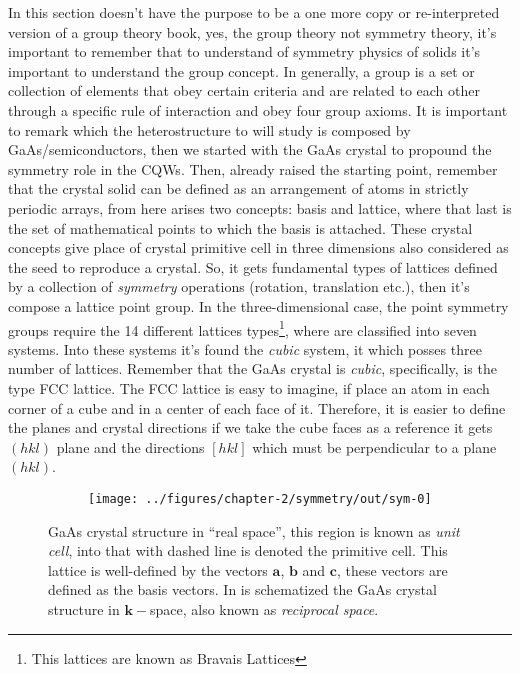 In this section doesn't have the purpose to be a one more copy or re-interpreted version of a group theory book, yes,  the group theory not symmetry theory, it's important to remember that to understand of symmetry physics of solids it's important to understand the group concept. 
In generally, a group is a set or collection of elements that obey certain criteria and are related to each other through a specific rule of interaction and obey four group axioms\cite{powell2010symmetry,cornwell1997group,muller2013symmetry}. 
It is important to remark which the heterostructure to will study is composed by GaAs/\algaas semiconductors, then  we started with the GaAs crystal to propound the symmetry role in the  CQWs.  Then, already raised the starting point,  remember that the crystal solid  can be defined as an  arrangement of atoms in strictly periodic arrays\cite{kittel2018kittel,solyom2007fundamentals}, from here arises two concepts: basis and lattice, where that last is the set of mathematical points to which the basis is attached\cite{kittel2018kittel}. These crystal concepts give place of crystal primitive cell in three dimensions also considered as the seed to reproduce a crystal. So, it gets  fundamental types of lattices defined  by a collection of \emph{symmetry} operations (rotation, translation etc.), then it's compose a lattice point group. In the three-dimensional case, the point symmetry groups require the 14 different lattices types\footnote{This lattices are known as Bravais Lattices}, where are classified into seven systems. Into these systems it's found the \emph{cubic} system, it which posses three number of lattices. Remember that the GaAs crystal is \emph{cubic},  specifically, is the type FCC lattice.  The FCC lattice is easy to imagine, if place an atom in each corner of  a cube and in a center of each face of it. Therefore, it is easier  to define  the planes and crystal directions if we take the cube faces as a reference it gets $(hkl)$ plane and the directions $\left[hkl\right]$ which must be perpendicular to a plane $(hkl)$\cite{kittel2018kittel}. 
\begin{figure}[h!]
	\centering
	\begin{subfigure}{\textwidth}
		\texttt{[image: ../figures/chapter-2/symmetry/out/sym-0]}
		\label{subfig:subsubsection-2.1-crystal-rspace-a)}
		\label{subfig:subsubsection-2.1-crystal-kspace-b)}
	\end{subfigure}
	\caption{ GaAs crystal structure in ``real space'',  this region is known as \emph{unit cell}, into that with dashed line is denoted the primitive cell. This lattice is well-defined by the vectors $\mathbf{a}$, $\mathbf{b}$ and $\mathbf{c}$, these vectors are defined as the basis vectors.  In  is schematized the GaAs crystal structure in $\boldsymbol{k}-$space, also known as \emph{reciprocal space}.}
	\label{fig:subsubsection-2.1-crystal-r-k-space}
\end{figure}

